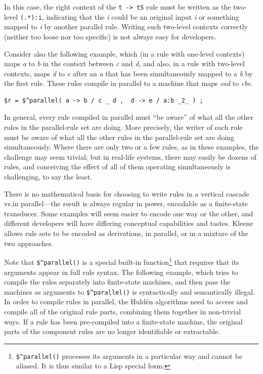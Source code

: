 \noindent
In this case, the right context of the \texttt{t -> tS} rule must be written as the
two-level \texttt{(.*):i}, indicating that the \emph{i} could be an original input
\emph{i} or something mapped to \emph{i} by another parallel rule.  Writing such two-level
contexts correctly (neither too loose nor too specific) is not always easy for
developers. 

Consider also the following example, which (in a rule with one-level contexts) maps
\emph{a} to \emph{b} in the context between \emph{c} and
\emph{d}, and also, in a rule with two-level contexts, maps \emph{d} to \emph{e} after an
\emph{a} that has been simultaneously mapped to a \emph{b} by the first rule.  These rules compile
in parallel to a machine that maps \emph{cad} to \emph{cbe}.

\begin{Verbatim}
$r = $^parallel( a -> b / c _ d ,  d -> e / a:b _2_ ) ;
\end{Verbatim}

In general, every rule compiled in parallel must ``be aware'' of what all the other rules
in the parallel-rule set are doing.  More precisely, the writer of each rule must be aware of
what all the other rules in the parallel-rule set are doing
simultaneously.  Where there are only two or a few rules,
as in these examples, the challenge may seem trivial; but in real-life systems, there may
easily be
dozens of rules, and conceiving the effect of all of them operating simultaneously is
challenging, to say the least.

There is no mathematical basis for choosing to write rules in a vertical cascade vs.\@ in
parallel---the result is always regular in power, encodable as a finite-state transducer.
Some examples will seem easier to encode one way or the other, and different developers
will have differing conceptual capabilities and tastes.  Kleene allows rule sets to be
encoded as derivations, in parallel, or in a mixture of the two approaches.

Note that \verb!$^parallel()! is a special built-in
function\footnote{\verb!$^parallel()! processes its arguments in a particular way and
cannot be aliased.  It is thus similar to a Lisp special form.}  that requires that its
arguments appear in full rule syntax.  The following example, which tries to compile the
rules separately into finite-state machines, and then pass the machines as arguments to
\verb!$^parallel()! is syntactically and semantically illegal.  In order to compile
rules in parallel, the Huld\'en algorithms need to access and compile all of the
original rule parts, combining them together in non-trivial ways.  If a rule has been
pre-compiled into a finite-state machine, the original parts of the component rules are
no longer identifiable or extractable.

